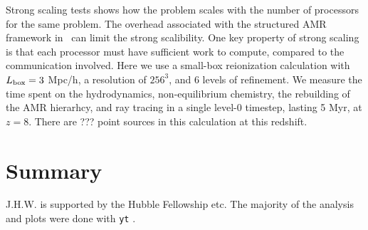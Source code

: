 \documentclass[12pt,preprint]{aastex}
\begin{document}
Strong scaling tests shows how the problem scales with the number of
processors for the same problem.  The overhead associated with the
structured AMR framework in \enzo~can limit the strong scalibility.
One key property of strong scaling is that each processor must have
sufficient work to compute, compared to the communication involved.
Here we use a small-box reionization calculation with $L_{\rm box} =
3$ Mpc/h, a resolution of $256^3$, and 6 levels of refinement.  We
measure the time spent on the hydrodynamics, non-equilibrium
chemistry, the rebuilding of the AMR hierarhcy, and ray tracing in a
single level-0 timestep, lasting 5 Myr, at $z=8$.  There are ??? point
sources in this calculation at this redshift.

\section{Summary}

\acknowledgments

J.H.W. is supported by the Hubble Fellowship etc.  The majority of the
analysis and plots were done with \texttt{yt} \citep{yt}.

\clearpage
%

\end{document}
